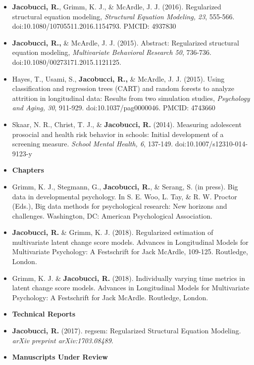 \documentclass[letterpaper,10pt]{article}
\begin{document}
\begin{itemize}
%
\item[]\textbf{Jacobucci, R.}, Grimm, K. J., \& McArdle, J. J. (2016). Regularized structural equation modeling, \emph{Structural Equation Modeling, 23}, 555-566. doi:10.1080/10705511.2016.1154793. PMCID: 4937830
%
%
\item[]\textbf{Jacobucci, R.,} \& McArdle, J. J. (2015). Abstract: Regularized structural equation modeling, \emph{Multivariate Behavioral Research 50}, 736-736. doi:10.1080/00273171.2015.1121125. 
%
\item[]Hayes, T., Usami, S., \textbf{Jacobucci, R.,} \& McArdle, J. J. (2015). Using classification and regression trees (CART) and random forests to analyze attrition in longitudinal data: Results from two simulation studies, \emph{Psychology and Aging, 30}, 911-929. doi:10.1037/pag0000046. PMCID: 4743660
%
\item[]Skaar, N. R., Christ, T. J., \& \textbf{Jacobucci, R.} (2014). Measuring adolescent prosocial and health risk behavior in schools: Initial development of a screening measure. \emph{School Mental Health, 6}, 137-149. doi:10.1007/s12310-014-9123-y
%
\vspace{3mm}
%
%
%
\item {\textbf{\large{Chapters}}}
\item[]Grimm, K. J., Stegmann, G., \textbf{Jacobucci, R.}, \& Serang, S. (in press). Big data in developmental psychology. In S. E. Woo, L. Tay, \& R. W. Proctor (Eds.), Big data methods for psychological research: New horizons and challenges. Washington, DC: American Psychological Association.
%
\item[] \textbf{Jacobucci, R.} \& Grimm, K. J. (2018). Regularized estimation of multivariate latent change score models. Advances in Longitudinal Models for Multivariate Psychology: A Festschrift for Jack McArdle, 109-125. Routledge, London.
%
\item[] Grimm, K. J. \& \textbf{Jacobucci, R.} (2018). Individually varying time metrics in latent change score models. Advances in Longitudinal Models for Multivariate Psychology: A Festschrift for Jack McArdle. Routledge, London.
%
%
\vspace{3mm}
%
\item {\textbf{\large{Technical Reports}}}
\item[] \textbf{Jacobucci, R.} (2017). regsem: Regularized Structural Equation Modeling. \emph{arXiv preprint arXiv:1703.08489}.
\vspace{3mm}
%
%
\item {\textbf{\large{Manuscripts Under Review}}}

\end{itemize}
\end{document}

